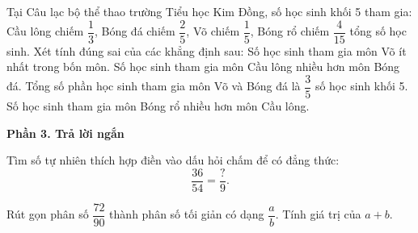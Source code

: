 \begin{ex} %
Tại Câu lạc bộ thể thao trường Tiểu học Kim Đồng, số học sinh khối 5 tham gia: Cầu lông chiếm $\dfrac{1}{3}$, Bóng đá chiếm $\dfrac{2}{5}$, Võ chiếm $\dfrac{1}{5}$, Bóng rổ chiếm $\dfrac{4}{15}$ tổng số học sinh. Xét tính đúng sai của các khẳng định sau:
\choiceTF
{\True Số học sinh tham gia môn Võ ít nhất trong bốn môn.}
{Số học sinh tham gia môn Cầu lông nhiều hơn môn Bóng đá.}
{\True Tổng số phần học sinh tham gia môn Võ và Bóng đá là $\dfrac{3}{5}$ số học sinh khối 5.}
{Số học sinh tham gia môn Bóng rổ nhiều hơn môn Cầu lông.}
\end{ex}

\textbf{Phần 3. Trả lời ngắn}

\begin{ex} %
Tìm số tự nhiên thích hợp điền vào dấu hỏi chấm để có đẳng thức:
\[
\dfrac{36}{54} = \dfrac{?}{9}.
\]
\end{ex}

\begin{ex} %
Rút gọn phân số $\dfrac{72}{90}$ thành phân số tối giản có dạng $\dfrac{a}{b}$. Tính giá trị của $a + b$.
\end{ex}

